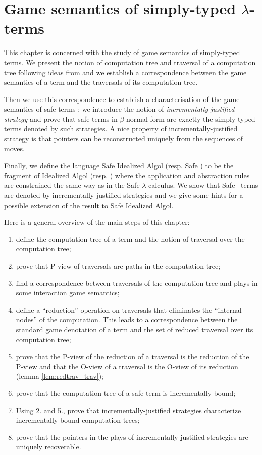 \chapter{Game semantics of simply-typed $\lambda$-terms}

This chapter is concerned with the study of game semantics of
simply-typed terms. We present the notion of computation tree and
traversal of a computation tree following ideas from
\cite{OngLics2006} and we establish a correspondence between the
game semantics of a term and the traversals of its computation tree.

Then we use this correspondence to establish a characterisation of
the game semantics of safe terms : we introduce the notion of
\emph{incrementally-justified strategy} and prove that safe terms in
$\beta$-normal form are exactly the simply-typed terms denoted by
such strategies. A nice property of incrementally-justified strategy
is that pointers can be reconstructed uniquely from the sequences of
moves.

Finally, we define the language Safe Idealized Algol (resp. Safe \pcf) to be the fragment of Idealized Algol (resp. \pcf) where the
application and abstraction rules are constrained the same way as in the Safe
$\lambda$-calculus. We show that Safe \pcf\ terms are denoted by
incrementally-justified strategies and we give some hints for a
possible extension of the result to Safe Idealized Algol.


Here is a general overview of the main steps of this chapter:
\begin{enumerate}
\item define the computation tree of a term and the notion of traversal over the computation tree;
\item prove that P-view of traversals are paths in the computation tree;
\item find a correspondence between traversals of the computation tree and plays in some interaction game semantics;
\item define a ``reduction'' operation on traversals that eliminates the ``internal nodes'' of the computation. This leads to a
correspondence between the standard game denotation of a term and the set of reduced traversal over its computation tree;
\item prove that the P-view of the reduction of a traversal is the reduction of the P-view
and that the O-view of a traversal is the O-view of its reduction (lemma \ref{lem:redtrav_trav});
\item prove that the computation tree of a safe term is incrementally-bound;
\item Using 2. and 5., prove that incrementally-justified strategies characterize incrementally-bound computation trees;
\item prove that the pointers in the plays of incrementally-justified strategies are uniquely recoverable.
\end{enumerate}

